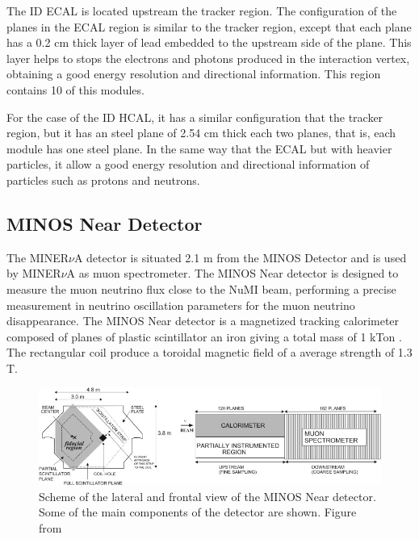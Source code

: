 \begin{itemize}
    The ID ECAL is located upstream the tracker region. The configuration of the planes in the ECAL region is similar to the tracker region, except that each plane has a 0.2 cm thick layer of lead embedded to the upstream side of the plane. This layer helps to stops the electrons and photons produced in the interaction vertex, obtaining a good energy resolution and directional information. This region contains 10 of this modules. 

    For the case of the ID HCAL, it has a similar configuration that the tracker region, but it has an steel plane of 2.54 cm thick each two planes, that is, each module has one steel plane. In the same way that the ECAL but with heavier particles, it allow a good energy resolution and directional information of particles such as protons and neutrons. 
    
\end{itemize}

\subsection{MINOS Near Detector}
\label{Cap:MnvExp:MnvDetector:MINOS}

The MINER$\nu$A detector is situated 2.1 m from the MINOS Detector and is used by MINER$\nu$A as muon spectrometer. The MINOS Near detector is designed to measure the muon neutrino flux close to the NuMI beam, performing a precise measurement in neutrino oscillation parameters for the muon neutrino disappearance. The MINOS Near detector is a magnetized tracking calorimeter composed of planes of plastic scintillator an iron giving a total mass of 1 kTon \cite{MINOSpaper}. The rectangular coil produce a toroidal magnetic field of a average strength of 1.3 T.

\begin{figure}
    \centering
    \includegraphics[scale=0.9]{Figures/Chapter2/MINOSNDScheme.jpg}
    \caption{Scheme of the lateral and frontal view of the MINOS Near detector. Some of the main components of the detector are shown. Figure from \cite{ALIAGA2014130}}
    \label{fig:MnvExp:MnvDetector:SchemeMINOSND}
\end{figure}

